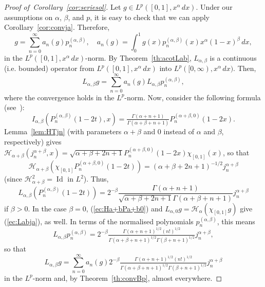 \documentclass[12pt,leqno]{amsart}
\theoremstyle{plain}
\newcommand{\Id}{\operatorname{Id}} %
\newcommand{\htr}{\mathcal{H}} %
\newcommand{\htra}{\mathcal{H}_\alpha} %
\newcommand{\ab}{{(\alpha,\beta)}} %
\begin{document}
\begin{proof}[Proof of~Corollary~\ref{cor:seriesol}]
Let $g \in L^p([0,1], x^\alpha \, dx)$. Under our assumptions on $\alpha$,
$\beta$, and $p$, it is easy to check that we can apply
Corollary~\ref{cor:convja}. Therefore,
\begin{equation*}
    g = \sum_{n=0}^{\infty}a_n(g)p_n^\ab,
    \quad
    a_n(g) = \int_0^1 g(x) p_n^\ab(x) x^\alpha (1-x)^\beta \, dx,
\end{equation*}
in the $L^p([0,1], x^\alpha \, dx)$-norm.
By Theorem~\ref{th:acotLab}, $L_{\alpha,\beta}$ is a continuous (i.e. bounded)
operator from $L^p([0,1], x^\alpha \, dx)$ into $L^p([0,\infty), x^\alpha \,
dx)$. Then,
\begin{equation*}
   L_{\alpha,\beta} g = \sum_{n=0}^{\infty}a_n(g) L_{\alpha,\beta} p_n^\ab,
\end{equation*}
where the convergence holds in the $L^p$-norm. Now, consider the following
formula (see~\cite[13.1 (43), p.~191]{E-TIT}):
\begin{equation*}
    I_{\alpha,\beta}(P_n^\ab(1-2t),x)
    = \tfrac{\Gamma(\alpha+n+1)}{\Gamma(\alpha+\beta+n+1)}
      P_n^{(\alpha+\beta,0)}(1-2x).
\end{equation*}
Lemma~\ref{lem:HTjn} (with parameters $\alpha+\beta$ and $0$ instead of
$\alpha$ and $\beta$, respectively) gives
$\htr_{\alpha+\beta}(j_n^{\alpha+\beta},x) = \sqrt{\alpha+\beta+2n+1}
P_n^{(\alpha+\beta,0)}(1-2x) \chi_{[0,1]}(x)$, so that
\begin{equation}
   \label{ec:Ha+bPa+b0}
   \htr_{\alpha+\beta}( \chi_{[0,1]} P_n^{(\alpha+\beta,0)}(1-2t))
   = (\alpha+\beta+2n+1)^{-1/2} j_n^{\alpha+\beta}
\end{equation}
(since $\htr_{\alpha+\beta}^2 = \Id$ in $L^2$). Thus,
\begin{equation}
    \label{ec:Labja}
    L_{\alpha,\beta}(P_n^{(\alpha,\beta)}(1-2t))
    = 2^{-\beta}
  \frac{\Gamma(\alpha+n+1)}{\sqrt{\alpha+\beta+2n+1} \Gamma(\alpha+\beta+n+1)}
   j_n^{\alpha+\beta}
\end{equation}
if $\beta > 0$. In the case $\beta = 0$, (\ref{ec:Ha+bPa+b0}) and
$L_{\alpha,0}g = \htra(\chi_{[0,1]} g)$ give (\ref{ec:Labja}), as well.
In terms of the normalised polynomials $p_n^{(\alpha,\beta)}$, this means
\begin{equation*}
    L_{\alpha,\beta} p_n^\ab =
      2^{-\beta} \tfrac{\Gamma(\alpha+n+1)^{1/2} (n!)^{1/2}}
        {\Gamma(\alpha+\beta+n+1)^{1/2} \Gamma(\beta+n+1)^{1/2}}
      j_n^{\alpha+\beta},
\end{equation*}
so that
\begin{equation*}
    L_{\alpha,\beta} g =
    \sum_{n=0}^\infty a_n(g)
      2^{-\beta} \tfrac{\Gamma(\alpha+n+1)^{1/2} (n!)^{1/2}}
        {\Gamma(\alpha+\beta+n+1)^{1/2} \Gamma(\beta+n+1)^{1/2}}
      j_n^{\alpha+\beta}
\end{equation*}
in the $L^p$-norm and, by Theorem~\ref{th:convBp}, almost everywhere.
\end{proof}
\end{document}

